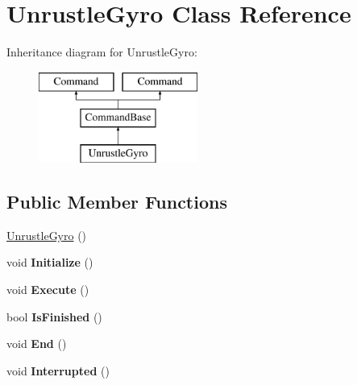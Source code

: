 \hypertarget{class_unrustle_gyro}{}\section{Unrustle\+Gyro Class Reference}
\label{class_unrustle_gyro}
Inheritance diagram for Unrustle\+Gyro\+:\begin{figure}[H]
\begin{center}
\leavevmode
\includegraphics[height=3.000000cm]{class_unrustle_gyro}
\end{center}
\end{figure}
\subsection*{Public Member Functions}
\begin{DoxyCompactItemize}
\item 
\hyperlink{class_unrustle_gyro_a7c6bc39a592510446374913f0e68761f}{Unrustle\+Gyro} ()
\item 
\hypertarget{class_unrustle_gyro_a529fdd89c9702dcbd8f7903065d725b2}{}void {\bfseries Initialize} ()\label{class_unrustle_gyro_a529fdd89c9702dcbd8f7903065d725b2}

\item 
\hypertarget{class_unrustle_gyro_ab72fe5e39db6bc546eaba44c9c667dfc}{}void {\bfseries Execute} ()\label{class_unrustle_gyro_ab72fe5e39db6bc546eaba44c9c667dfc}

\item 
\hypertarget{class_unrustle_gyro_a5a66a724c6e222a7bbd4da6db5575692}{}bool {\bfseries Is\+Finished} ()\label{class_unrustle_gyro_a5a66a724c6e222a7bbd4da6db5575692}

\item 
\hypertarget{class_unrustle_gyro_a9a871544974afb6935826b30bd319d0f}{}void {\bfseries End} ()\label{class_unrustle_gyro_a9a871544974afb6935826b30bd319d0f}

\item 
\hypertarget{class_unrustle_gyro_adf5ab1c63dbca8f1e8705b061d15534d}{}void {\bfseries Interrupted} ()\label{class_unrustle_gyro_adf5ab1c63dbca8f1e8705b061d15534d}

\end{DoxyCompactItemize}
